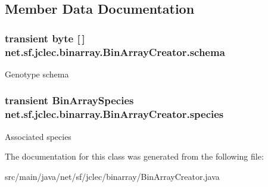 \subsection{Member Data Documentation}
\hypertarget{classnet_1_1sf_1_1jclec_1_1binarray_1_1_bin_array_creator_aaa529b1abd5a153760b138335d258926}{
\subsubsection[{schema}]{\setlength{\rightskip}{0pt plus 5cm}transient byte \mbox{[}$\,$\mbox{]} net.\-sf.\-jclec.\-binarray.\-Bin\-Array\-Creator.\-schema\hspace{0.3cm}{\ttfamily [protected]}}}\label{classnet_1_1sf_1_1jclec_1_1binarray_1_1_bin_array_creator_aaa529b1abd5a153760b138335d258926}
Genotype schema \hypertarget{classnet_1_1sf_1_1jclec_1_1binarray_1_1_bin_array_creator_a166ddebeaa80af211d1bb7c87786d7e7}{
\subsubsection[{species}]{\setlength{\rightskip}{0pt plus 5cm}transient {\bf Bin\-Array\-Species} net.\-sf.\-jclec.\-binarray.\-Bin\-Array\-Creator.\-species\hspace{0.3cm}{\ttfamily [protected]}}}\label{classnet_1_1sf_1_1jclec_1_1binarray_1_1_bin_array_creator_a166ddebeaa80af211d1bb7c87786d7e7}
Associated species 

The documentation for this class was generated from the following file\-:\begin{DoxyCompactItemize}
\item 
src/main/java/net/sf/jclec/binarray/Bin\-Array\-Creator.\-java\end{DoxyCompactItemize}
